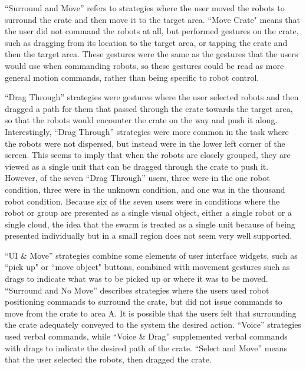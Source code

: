 ``Surround and Move'' refers to strategies where the user moved the robots to surround the crate and then move it to the target area. 
``Move Crate" means that the user did not command the robots at all, but performed gestures on the crate, such as dragging from its location to the target area, or tapping the crate and then the target area. 
These gestures were the same as the gestures that the users would use when commanding robots, so these gestures could be read as more general motion commands, rather than being specific to robot control. 

``Drag Through'' strategies were gestures where the user selected robots and then dragged a path for them that passed through the crate towards the target area, so that the robots would encounter the crate on the way and push it along. 
Interestingly, ``Drag Through'' strategies were more common in the task where the robots were not dispersed, but instead were in the lower left corner of the screen. 
This seems to imply that when the robots are closely grouped, they are viewed as a single unit that can be dragged through the crate to push it. 
However, of the seven ``Drag Through'' users, three were in the one robot condition, three were in the unknown condition, and one was in the thousand robot condition. 
Because six of the seven users were in conditions where the robot or group are presented as a single visual object, either a single robot or a single cloud, the idea that the swarm is treated as a single unit because of being presented individually but in a small region does not seem very well supported. 

``UI \& Move'' strategies combine some elements of user interface widgets, such as ``pick up" or ``move object" buttons, combined with movement gestures such as drags to indicate what was to be picked up or where it was to be moved. 
``Surround and No Move'' describes strategies where the users used robot positioning commands to surround the crate, but did not issue commands to move from the crate to area A.
It is possible that the users felt that surrounding the crate adequately conveyed to the system the desired action. 
``Voice'' strategies used verbal commands, while ``Voice \& Drag'' supplemented verbal commands with drags to indicate the desired path of the crate. 
``Select and Move'' means that the user selected the robots, then dragged the crate.

